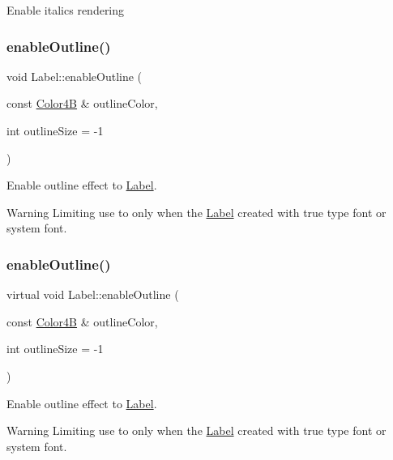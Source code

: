 Enable italics rendering \mbox{\label{classLabel_a7a018cd2ee48a60de9ed8983938573d8}} 
\subsubsection{\texorpdfstring{enable\+Outline()}{enableOutline()}\hspace{0.1cm}{\footnotesize\ttfamily [1/2]}}
{\footnotesize\ttfamily void Label\+::enable\+Outline (\begin{DoxyParamCaption}\item[{const \hyperlink{structColor4B}{Color4B} \&}]{outline\+Color,  }\item[{int}]{outline\+Size = {\ttfamily -\/1} }\end{DoxyParamCaption})\hspace{0.3cm}{\ttfamily [virtual]}}

Enable outline effect to \hyperlink{classLabel}{Label}. \begin{DoxyWarning}{Warning}
Limiting use to only when the \hyperlink{classLabel}{Label} created with true type font or system font. 
\end{DoxyWarning}
\mbox{\label{classLabel_a1dcf7a3bc06dfbfdf858cd45bbc8c4de}} 
\subsubsection{\texorpdfstring{enable\+Outline()}{enableOutline()}\hspace{0.1cm}{\footnotesize\ttfamily [2/2]}}
{\footnotesize\ttfamily virtual void Label\+::enable\+Outline (\begin{DoxyParamCaption}\item[{const \hyperlink{structColor4B}{Color4B} \&}]{outline\+Color,  }\item[{int}]{outline\+Size = {\ttfamily -\/1} }\end{DoxyParamCaption})\hspace{0.3cm}{\ttfamily [virtual]}}

Enable outline effect to \hyperlink{classLabel}{Label}. \begin{DoxyWarning}{Warning}
Limiting use to only when the \hyperlink{classLabel}{Label} created with true type font or system font. 
\end{DoxyWarning}
\mbox{\label{classLabel_a274a555bb2bd7b10d36a9de5ee361399}} 
